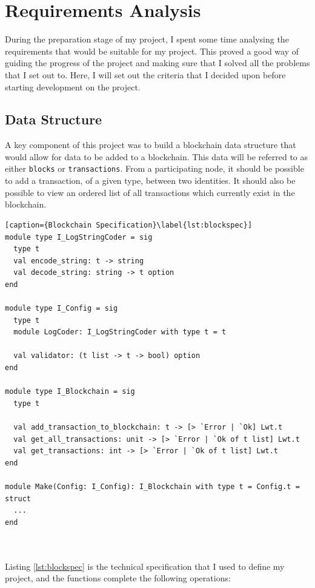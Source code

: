 \documentclass[12pt,a4paper,twoside,openright]{report}
\begin{document}
	\section{Requirements Analysis} \label{Requirements Analysis}
	During the preparation stage of my project, I spent some time analysing the requirements that would be suitable for my project. This proved a good way of guiding the progress of the project and making sure that I solved all the problems that I set out to. Here, I will set out the criteria that I decided upon before starting development on the project.
	\subsection{Data Structure}
	A key component of this project was to build a blockchain data structure that would allow for data to be added to a blockchain. 
	This data will be referred to as either \texttt{blocks} or \texttt{transactions}. 
	From a participating node, it should be possible to add a transaction, of a given type, between two identities. 
	It should also be possible to view an ordered list of all transactions which currently exist in the blockchain.
	\begin{minipage}{\linewidth}
	\begin{lstlisting}[caption={Blockchain Specification}\label{lst:blockspec}]
module type I_LogStringCoder = sig
  type t
  val encode_string: t -> string
  val decode_string: string -> t option
end

module type I_Config = sig
  type t
  module LogCoder: I_LogStringCoder with type t = t

  val validator: (t list -> t -> bool) option
end

module type I_Blockchain = sig
  type t

  val add_transaction_to_blockchain: t -> [> `Error | `Ok] Lwt.t
  val get_all_transactions: unit -> [> `Error | `Ok of t list] Lwt.t
  val get_transactions: int -> [> `Error | `Ok of t list] Lwt.t
end

module Make(Config: I_Config): I_Blockchain with type t = Config.t = struct 
  ...
end
	\end{lstlisting}
	\end{minipage}\\
	\\
	Listing \ref{lst:blockspec} is the technical specification that I used to define my project, and the functions complete the following operations:
\end{document}
